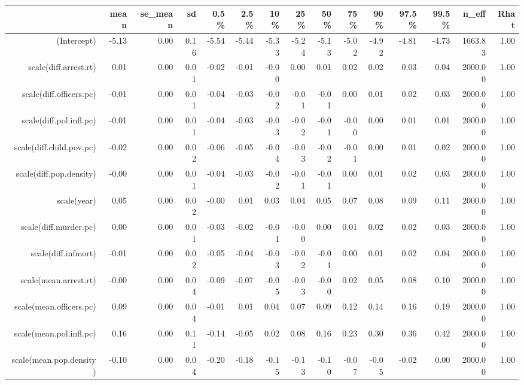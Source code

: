 \begin{table}[ht]
\centering
\begin{tabular}{rrrrrrrrrrrrrrr}
  \hline
 & mean & se\_mean & sd & 0.5\% & 2.5\% & 10\% & 25\% & 50\% & 75\% & 90\% & 97.5\% & 99.5\% & n\_eff & Rhat \\ 
  \hline
(Intercept) & -5.13 & 0.00 & 0.16 & -5.54 & -5.44 & -5.33 & -5.24 & -5.13 & -5.02 & -4.92 & -4.81 & -4.73 & 1663.83 & 1.00 \\ 
  scale(diff.arrest.rt) & 0.01 & 0.00 & 0.01 & -0.02 & -0.01 & -0.00 & 0.00 & 0.01 & 0.02 & 0.02 & 0.03 & 0.04 & 2000.00 & 1.00 \\ 
  scale(diff.officers.pc) & -0.01 & 0.00 & 0.01 & -0.04 & -0.03 & -0.02 & -0.01 & -0.01 & 0.00 & 0.01 & 0.02 & 0.03 & 2000.00 & 1.00 \\ 
  scale(diff.pol.infl.pc) & -0.01 & 0.00 & 0.01 & -0.04 & -0.03 & -0.03 & -0.02 & -0.01 & -0.00 & 0.00 & 0.01 & 0.01 & 2000.00 & 1.00 \\ 
  scale(diff.child.pov.pc) & -0.02 & 0.00 & 0.02 & -0.06 & -0.05 & -0.04 & -0.03 & -0.02 & -0.01 & 0.00 & 0.01 & 0.02 & 2000.00 & 1.00 \\ 
  scale(diff.pop.density) & -0.00 & 0.00 & 0.01 & -0.04 & -0.03 & -0.02 & -0.01 & -0.01 & 0.00 & 0.01 & 0.02 & 0.03 & 2000.00 & 1.00 \\ 
  scale(year) & 0.05 & 0.00 & 0.02 & -0.00 & 0.01 & 0.03 & 0.04 & 0.05 & 0.07 & 0.08 & 0.09 & 0.11 & 2000.00 & 1.00 \\ 
  scale(diff.murder.pc) & 0.00 & 0.00 & 0.01 & -0.03 & -0.02 & -0.01 & -0.00 & 0.00 & 0.01 & 0.02 & 0.02 & 0.03 & 2000.00 & 1.00 \\ 
  scale(diff.infmort) & -0.01 & 0.00 & 0.02 & -0.05 & -0.04 & -0.03 & -0.02 & -0.01 & 0.00 & 0.01 & 0.02 & 0.04 & 2000.00 & 1.00 \\ 
  scale(mean.arrest.rt) & -0.00 & 0.00 & 0.04 & -0.09 & -0.07 & -0.05 & -0.03 & -0.00 & 0.02 & 0.05 & 0.08 & 0.10 & 2000.00 & 1.00 \\ 
  scale(mean.officers.pc) & 0.09 & 0.00 & 0.04 & -0.01 & 0.01 & 0.04 & 0.07 & 0.09 & 0.12 & 0.14 & 0.16 & 0.19 & 2000.00 & 1.00 \\ 
  scale(mean.pol.infl.pc) & 0.16 & 0.00 & 0.11 & -0.14 & -0.05 & 0.02 & 0.08 & 0.16 & 0.23 & 0.30 & 0.36 & 0.42 & 2000.00 & 1.00 \\ 
  scale(mean.pop.density) & -0.10 & 0.00 & 0.04 & -0.20 & -0.18 & -0.15 & -0.13 & -0.10 & -0.07 & -0.05 & -0.02 & 0.00 & 2000.00 & 1.00 \\ 

\end{tabular}
\end{table}
